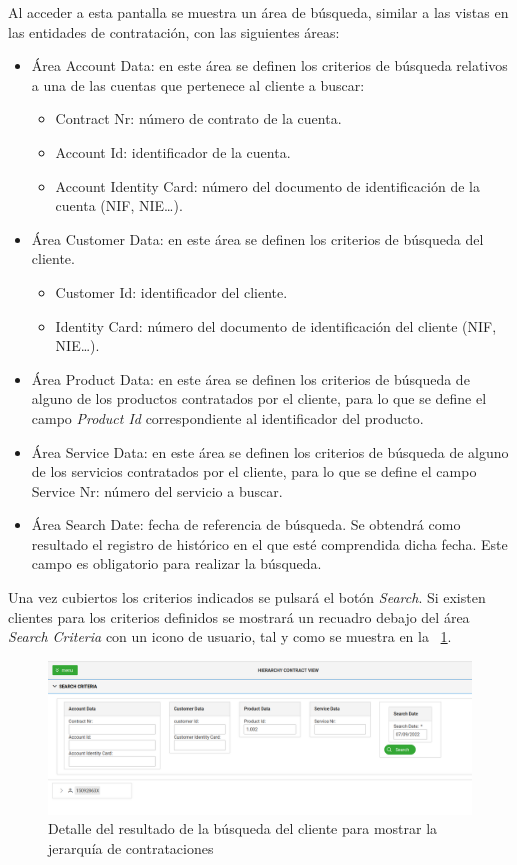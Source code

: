 Al acceder a esta pantalla se muestra un área de búsqueda, similar a las vistas en las entidades de contratación, con las siguientes áreas:
\begin{itemize}
	\item Área Account Data: en este área se definen los criterios de búsqueda relativos a una de las cuentas que pertenece al cliente a buscar:
		\begin{itemize}
			\item Contract Nr: número de contrato de la cuenta.
			\item Account Id: identificador de la cuenta.
			\item Account Identity Card: número del documento de identificación de la cuenta (NIF, NIE\dots).
		\end{itemize}
	\item Área Customer Data: en este área se definen los criterios de búsqueda del cliente.
		\begin{itemize}
			\item Customer Id: identificador del cliente.
			\item Identity Card: número del documento de identificación del cliente (NIF, NIE\dots).
		\end{itemize}
	\item Área Product Data: en este área se definen los criterios de búsqueda de alguno de los productos contratados por el cliente, para lo que se define el campo \emph{Product Id} correspondiente al identificador del producto.
	\item Área Service Data: en este área se definen los criterios de búsqueda de alguno de los servicios contratados por el cliente, para lo que se define el campo Service Nr: número del servicio a buscar.
	\item Área Search Date: fecha de referencia de búsqueda. Se obtendrá como resultado el registro de histórico en el que esté comprendida dicha fecha. Este campo es obligatorio para realizar la búsqueda.
\end{itemize}

Una vez cubiertos los criterios indicados se pulsará el botón \emph{Search}. Si existen clientes para los criterios definidos se mostrará un recuadro debajo del área \emph{Search Criteria} con un icono de usuario, tal y como se muestra en la \figurename~\ref{fig:vista-jerarquia-01}.

\begin{figure}
  \centering
  \includegraphics[width=\textwidth]{imaxes/vista-jerarquia-01.png}
  \caption{Detalle del resultado de la búsqueda del cliente para mostrar la jerarquía de contrataciones}
  \label{fig:vista-jerarquia-01}
\end{figure}

